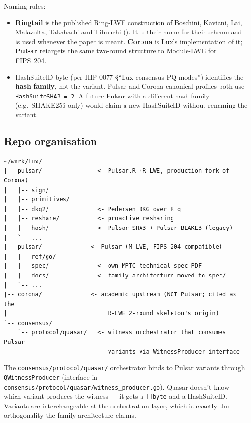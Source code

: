 Naming rules:

\begin{itemize}[leftmargin=*, itemsep=0pt]
\item \textbf{Ringtail} is the published Ring-LWE construction of
Boschini, Kaviani, Lai, Malavolta, Takahashi and Tibouchi
(\cite{boschini2024ringtail}). It is their name for their scheme and is
used whenever the paper is meant. \textbf{Corona} is Lux's
implementation of it; \textbf{Pulsar} retargets the same two-round
structure to Module-LWE for FIPS~204.
\item HashSuiteID byte (per HIP-0077 \S``Lux consensus PQ modes'')
identifies the \textbf{hash family}, not the variant. Pulsar and
Corona canonical profiles both use \texttt{HashSuiteSHA3 = 2}. A
future Pulsar with a different hash family (e.g.\ SHAKE256 only)
would claim a new HashSuiteID without renaming the variant.
\end{itemize}

\subsection{Repo organisation}

\begin{verbatim}
~/work/lux/
|-- pulsar/                <- Pulsar.R (R-LWE, production fork of Corona)
|   |-- sign/
|   |-- primitives/
|   |-- dkg2/              <- Pedersen DKG over R_q
|   |-- reshare/           <- proactive resharing
|   |-- hash/              <- Pulsar-SHA3 + Pulsar-BLAKE3 (legacy)
|   `-- ...
|-- pulsar/              <- Pulsar (M-LWE, FIPS 204-compatible)
|   |-- ref/go/
|   |-- spec/              <- own MPTC technical spec PDF
|   |-- docs/              <- family-architecture moved to spec/
|   `-- ...
|-- corona/              <- academic upstream (NOT Pulsar; cited as the
|                             R-LWE 2-round skeleton's origin)
`-- consensus/
    `-- protocol/quasar/   <- witness orchestrator that consumes Pulsar
                              variants via WitnessProducer interface
\end{verbatim}

The \texttt{consensus/protocol/quasar/} orchestrator binds to Pulsar
variants through \texttt{QWitnessProducer} (interface in
\texttt{consensus/protocol/quasar/witness\_producer.go}). Quasar
doesn't know which variant produces the witness --- it gets a
\texttt{[]byte} and a HashSuiteID. Variants are interchangeable at
the orchestration layer, which is exactly the orthogonality the
family architecture claims.

